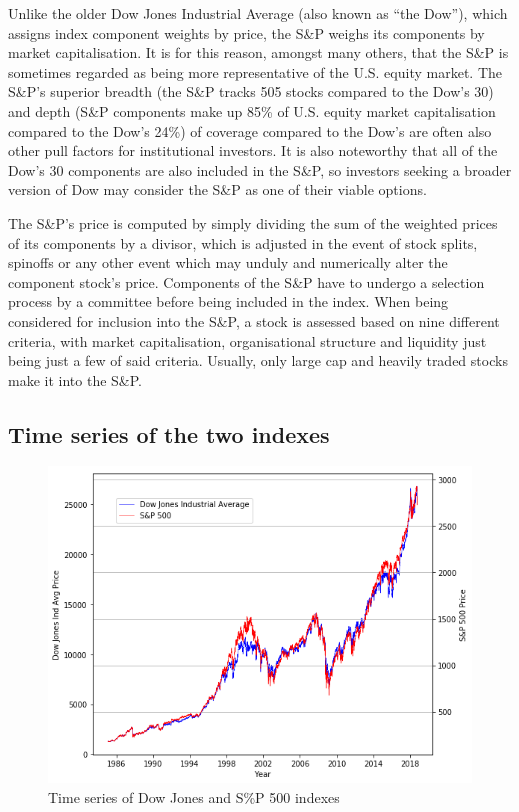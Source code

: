 \documentclass[a4paper]{article}
\begin{document}
Unlike the older Dow Jones Industrial Average (also known as “the Dow”), which assigns index component weights by price, the S\&P weighs its components by market capitalisation. It is for this reason, amongst many others, that the S\&P is sometimes regarded as being more representative of the U.S. equity market. The S\&P’s superior breadth (the S\&P tracks 505 stocks compared to the Dow’s 30) and depth (S\&P components make up 85\% of U.S. equity market capitalisation compared to the Dow’s 24\%) of coverage compared to the Dow’s are often also other pull factors for institutional investors. It is also noteworthy that all of the Dow’s 30 components are also included in the S\&P, so investors seeking a broader version of Dow may consider the S\&P as one of their viable options.

The S\&P’s price is computed by simply dividing the sum of the weighted prices of its components by a divisor, which is adjusted in the event of stock splits, spinoffs or any other event which may unduly and numerically alter the component stock’s price. Components of the S\&P have to undergo a selection process by a committee before being included in the index.  When being considered for inclusion into the S\&P, a stock is assessed based on nine different criteria, with market capitalisation, organisational structure and liquidity just being just a few of said criteria. Usually, only large cap and heavily traded stocks make it into the S\&P.

\subsection{Time series of the two indexes}

\begin{figure}[h]
	\centering
	\includegraphics[width=0.8\linewidth]{time_series.png}
	\caption{Time series of Dow Jones and S\%P 500 indexes}
\end{figure}
\end{document}
